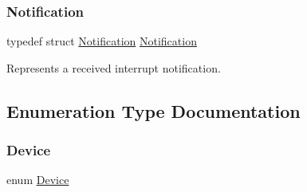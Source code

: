 \mbox{\label{group__interrupts_ga856319b58b1fcbc4b74dc4c26524e7d7}} 
\subsubsection{\texorpdfstring{Notification}{Notification}}
{\footnotesize\ttfamily typedef struct \mbox{\hyperlink{struct_notification}{Notification}}  \mbox{\hyperlink{struct_notification}{Notification}}}



Represents a received interrupt notification. 



\subsection{Enumeration Type Documentation}
\mbox{\label{group__interrupts_gadb53a8cc97236ca207c035241a5b7fb8}} 
\subsubsection{\texorpdfstring{Device}{Device}}
{\footnotesize\ttfamily enum \mbox{\hyperlink{group__interrupts_gadb53a8cc97236ca207c035241a5b7fb8}{Device}}}

